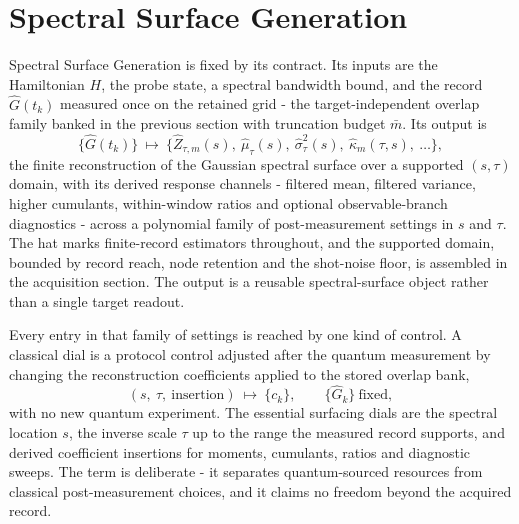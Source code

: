 \section{Spectral Surface Generation}\label{sec:N3}

Spectral Surface Generation is fixed by its contract. Its inputs are the Hamiltonian $H$, the probe state, a spectral bandwidth bound, and the record $\widehat G(t_k)$ measured once on the retained grid - the target-independent overlap family banked in the previous section with truncation budget $\bar m$. Its output is
\begin{equation}\label{def:protocol-output-specification}
\bigl\{\widehat G(t_k)\bigr\}\ \longmapsto\ \bigl\{\widehat Z_{\tau,m}(s),\ \widehat\mu_\tau(s),\ \widehat\sigma_\tau^{2}(s),\ \widehat\kappa_m(\tau,s),\ \dots\bigr\},
\end{equation}
the finite reconstruction of the Gaussian spectral surface over a supported $(s,\tau)$ domain, with its derived response channels - filtered mean, filtered variance, higher cumulants, within-window ratios and optional observable-branch diagnostics - across a polynomial family of post-measurement settings in $s$ and $\tau$. The hat marks finite-record estimators throughout, and the supported domain, bounded by record reach, node retention and the shot-noise floor, is assembled in the acquisition section. The output is a reusable spectral-surface object rather than a single target readout.

Every entry in that family of settings is reached by one kind of control. A classical dial is a protocol control adjusted after the quantum measurement by changing the reconstruction coefficients applied to the stored overlap bank,
\begin{equation}\label{def:classical-dial}
(s,\ \tau,\ \text{insertion})\ \longmapsto\ \{c_k\},\qquad \{\widehat G_k\}\ \text{fixed},
\end{equation}
with no new quantum experiment. The essential surfacing dials are the spectral location $s$, the inverse scale $\tau$ up to the range the measured record supports, and derived coefficient insertions for moments, cumulants, ratios and diagnostic sweeps. The term is deliberate - it separates quantum-sourced resources from classical post-measurement choices, and it claims no freedom beyond the acquired record.

